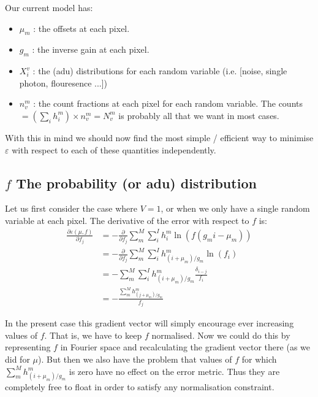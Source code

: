 \documentclass[11pt]{article}
\begin{document}
Our current model has:
\begin{itemize}
  \item $\mu_m$ : the offsets at each pixel.
  \item $g_m$   : the inverse gain at each pixel.
  \item $X^v_i$ : the (adu) distributions for each random variable (i.e. [noise, single photon, flouresence ...])
  \item $n^m_v$ : the count fractions at each pixel for each random variable. The counts $= (\sum_i h^m_i) \times n^m_v = N^m_v$ is probably all that we want in most cases.
\end{itemize}

With this in mind we should now find the most simple / efficient way to minimise $\varepsilon$ with respect to each of these quantities independently. 















\subsection{$f$ The probability (or adu) distribution}
Let us first consider the case where $V=1$, or when we only have a single random variable at each pixel. The derivative of the error with respect to $f$ is:
\begin{align}
   \frac{\partial \varepsilon(\mu, f)}{\partial f_j} &= -\frac{\partial}{\partial f_j} \sum_m^M \sum_i^I h^m_i \ln(f(g_mi - \mu_m)) \\
   &= -\frac{\partial}{\partial f_j} \sum_m^M \sum_i^I h^m_{(i+\mu_m)/g_m} \ln(f_i) \\
   &= -\sum_m^M \sum_i^I h^m_{(i+\mu_m)/g_m} \frac{\delta_{i-j}}{f_i} \\
   &= -\frac{\sum_m^M h^m_{(j+\mu_m)/g_m}}{f_j}
\end{align}

In the present case this gradient vector will simply encourage ever increasing values of $f$. That is, we have to keep $f$ normalised. Now we could do this by representing $f$ in Fourier space and recalculating the gradient vector there (as we did for $\mu$). But then we also have the problem that values of $f$ for which $\sum_m^M h^m_{(i+\mu_m)/g_m}$ is zero have no effect on the error metric. Thus they are completely free to float in order to satisfy any normalisation constraint.
\end{document}
